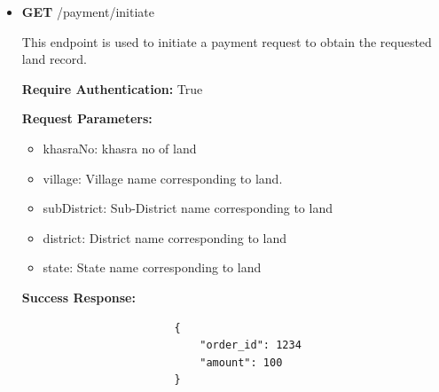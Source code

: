 \documentclass[12pt]{article}
\begin{document}
\begin{itemize}
            \item \textbf{GET}  /payment/initiate
                \begin{addmargin}[1em]{2em}%
                    This endpoint is used to initiate a payment request to obtain the requested land record.
                    \par\textbf{Require Authentication:} True
                    \par\textbf{Request Parameters:}
                    \begin{itemize}
                        \item khasraNo: khasra no of land
                        \item village: Village name corresponding to land.
                        \item subDistrict: Sub-District name corresponding to land
                        \item district: District name corresponding to land
                        \item state: State name corresponding to land
                    \end{itemize}
                    \par\textbf{Success Response:}
                    \begin{listing}[H]
                    \begin{verbatim}
                        {   
                            "order_id": 1234
                            "amount": 100
                        }
                    \end{verbatim}
                   \end{listing}
                \end{addmargin}


\end{itemize}
\end{document}
